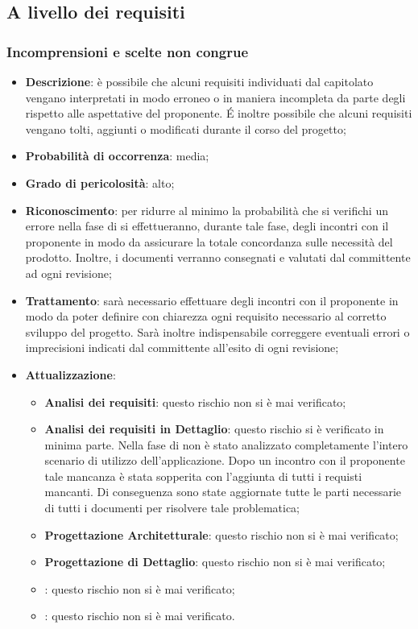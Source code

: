 	\subsection{A livello dei requisiti}
	
		\subsubsection{Incomprensioni e scelte non congrue}
		\begin{itemize}
			\item \textbf{Descrizione}: è possibile che alcuni requisiti individuati dal capitolato vengano interpretati in modo erroneo o in maniera incompleta da parte degli \textit{\Anas} rispetto alle aspettative del proponente. \'E inoltre possibile che alcuni requisiti vengano tolti, aggiunti o modificati durante il corso del progetto;
			\item \textbf{Probabilità di occorrenza}: media;
			\item \textbf{Grado di pericolosità}: alto;
			\item \textbf{Riconoscimento}: per ridurre al minimo la probabilità che si verifichi un errore nella fase di \textit{\AdR{}} si effettueranno, durante tale fase, degli incontri con il proponente in modo da assicurare la totale concordanza sulle necessità del prodotto. Inoltre, i documenti verranno consegnati e valutati dal committente ad ogni revisione;
			\item \textbf{Trattamento}: sarà necessario effettuare degli incontri con il proponente in modo da poter definire con chiarezza ogni requisito necessario al corretto sviluppo del progetto. Sarà inoltre indispensabile correggere eventuali errori o imprecisioni indicati dal committente all'esito di ogni revisione;
			\item \textbf{Attualizzazione}:
			\begin{itemize}
				\item \textbf{Analisi dei requisiti}: questo rischio non si è mai verificato;
				\item \textbf{Analisi dei requisiti in Dettaglio}: questo rischio si è verificato in minima parte. Nella fase di \AdR{} non è stato analizzato completamente l'intero scenario di utilizzo dell'applicazione. Dopo un incontro con il proponente tale mancanza è stata sopperita con l'aggiunta di tutti i requisti mancanti. Di conseguenza sono state aggiornate tutte le parti necessarie di tutti i documenti per risolvere tale problematica; 
				\item \textbf{Progettazione Architetturale}: questo rischio non si è mai verificato;
				\item \textbf{Progettazione di Dettaglio}: questo rischio non si è mai verificato;
				\item \textbf{\CO}: questo rischio non si è mai verificato;
				\item \textbf{\VV}: questo rischio non si è mai verificato. 
			\end{itemize}
		\end{itemize}
	
